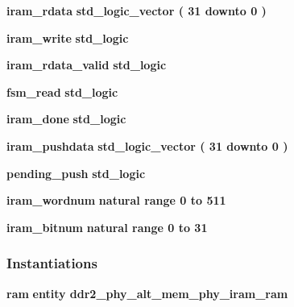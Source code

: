\begin{DoxyCompactItemize}
\item 
{\bf iram\+\_\+rdata} {\bfseries \textcolor{comment}{std\+\_\+logic\+\_\+vector}\textcolor{vhdlchar}{ }\textcolor{vhdlchar}{(}\textcolor{vhdlchar}{ }\textcolor{vhdlchar}{ } \textcolor{vhdldigit}{31} \textcolor{vhdlchar}{ }\textcolor{keywordflow}{downto}\textcolor{vhdlchar}{ }\textcolor{vhdlchar}{ } \textcolor{vhdldigit}{0} \textcolor{vhdlchar}{ }\textcolor{vhdlchar}{)}\textcolor{vhdlchar}{ }} 
\item 
{\bf iram\+\_\+write} {\bfseries \textcolor{comment}{std\+\_\+logic}\textcolor{vhdlchar}{ }} 
\item 
{\bf iram\+\_\+rdata\+\_\+valid} {\bfseries \textcolor{comment}{std\+\_\+logic}\textcolor{vhdlchar}{ }} 
\item 
{\bf fsm\+\_\+read} {\bfseries \textcolor{comment}{std\+\_\+logic}\textcolor{vhdlchar}{ }} 
\item 
{\bf iram\+\_\+done} {\bfseries \textcolor{comment}{std\+\_\+logic}\textcolor{vhdlchar}{ }} 
\item 
{\bf iram\+\_\+pushdata} {\bfseries \textcolor{comment}{std\+\_\+logic\+\_\+vector}\textcolor{vhdlchar}{ }\textcolor{vhdlchar}{(}\textcolor{vhdlchar}{ }\textcolor{vhdlchar}{ } \textcolor{vhdldigit}{31} \textcolor{vhdlchar}{ }\textcolor{keywordflow}{downto}\textcolor{vhdlchar}{ }\textcolor{vhdlchar}{ } \textcolor{vhdldigit}{0} \textcolor{vhdlchar}{ }\textcolor{vhdlchar}{)}\textcolor{vhdlchar}{ }} 
\item 
{\bf pending\+\_\+push} {\bfseries \textcolor{comment}{std\+\_\+logic}\textcolor{vhdlchar}{ }} 
\item 
{\bf iram\+\_\+wordnum} {\bfseries \textcolor{comment}{natural}\textcolor{vhdlchar}{ }\textcolor{vhdlchar}{ }\textcolor{vhdlchar}{ }\textcolor{keywordflow}{range}\textcolor{vhdlchar}{ }\textcolor{vhdlchar}{ } \textcolor{vhdldigit}{0} \textcolor{vhdlchar}{ }\textcolor{keywordflow}{to}\textcolor{vhdlchar}{ }\textcolor{vhdlchar}{ } \textcolor{vhdldigit}{511} \textcolor{vhdlchar}{ }} 
\item 
{\bf iram\+\_\+bitnum} {\bfseries \textcolor{comment}{natural}\textcolor{vhdlchar}{ }\textcolor{vhdlchar}{ }\textcolor{vhdlchar}{ }\textcolor{keywordflow}{range}\textcolor{vhdlchar}{ }\textcolor{vhdlchar}{ } \textcolor{vhdldigit}{0} \textcolor{vhdlchar}{ }\textcolor{keywordflow}{to}\textcolor{vhdlchar}{ }\textcolor{vhdlchar}{ } \textcolor{vhdldigit}{31} \textcolor{vhdlchar}{ }} 
\end{DoxyCompactItemize}
\subsubsection*{Instantiations}
 \begin{DoxyCompactItemize}
\item 
{\bf ram}  {\bfseries entity ddr2\+\_\+phy\+\_\+alt\+\_\+mem\+\_\+phy\+\_\+iram\+\_\+ram}   
\end{DoxyCompactItemize}


